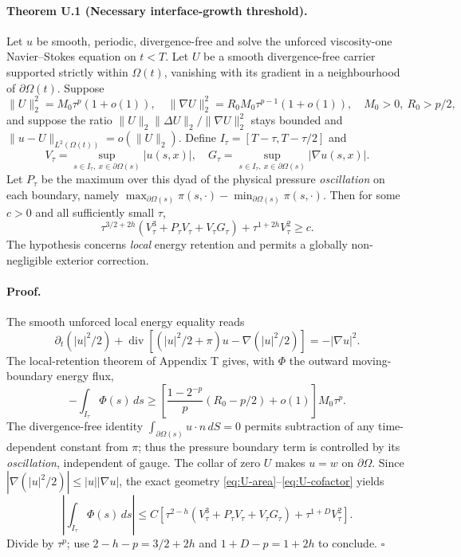 \paragraph{Theorem U.1 (Necessary interface-growth threshold).}
Let $u$ be smooth, periodic, divergence-free and solve the unforced viscosity-one Navier--Stokes equation on $t<T$. Let $U$ be a smooth divergence-free carrier supported strictly within $\Omega(t)$, vanishing with its gradient in a neighbourhood of $\partial\Omega(t)$. Suppose
\[
 \|U\|_2^2=M_0\tau^p(1+o(1)),\quad
 \|\nabla U\|_2^2=R_0M_0\tau^{p-1}(1+o(1)),
 \quad M_0>0,\ R_0>p/2,
\]
and suppose the ratio $\|U\|_2\|\Delta U\|_2/\|\nabla U\|_2^2$ stays bounded and $\|u-U\|_{L^2(\Omega(t))}=o(\|U\|_2)$. Define $I_\tau=[T-\tau,T-\tau/2]$ and
\[
 V_\tau=\sup_{s\in I_\tau,\ x\in\partial\Omega(s)}|u(s,x)|,\quad
 G_\tau=\sup_{s\in I_\tau,\ x\in\partial\Omega(s)}|\nabla u(s,x)|.
\]
Let $P_\tau$ be the maximum over this dyad of the physical pressure \emph{oscillation} on each boundary, namely $\max_{\partial\Omega(s)}\pi(s,\cdot)-\min_{\partial\Omega(s)}\pi(s,\cdot)$. Then for some $c>0$ and all sufficiently small $\tau$,
\begin{equation}\label{eq:U-threshold}
 \boxed{\tau^{3/2+2h}\left(V_\tau^3+P_\tau V_\tau+V_\tau G_\tau\right)
 +\tau^{1+2h}V_\tau^2\ge c.}
\end{equation}
The hypothesis concerns \emph{local} energy retention and permits a globally non-negligible exterior correction.

\paragraph{Proof.}
The smooth unforced local energy equality reads
\[
 \partial_t(|u|^2/2)+\operatorname{div}[ (|u|^2/2+\pi)u-\nabla(|u|^2/2)]
 =-|\nabla u|^2.
\]
The local-retention theorem of Appendix T gives, with $\Phi$ the outward moving-boundary energy flux,
\[
 -\int_{I_\tau}\Phi(s)\,ds\ge
 \left[\frac{1-2^{-p}}{p}(R_0-p/2)+o(1)\right]M_0\tau^p.
\]
The divergence-free identity $\int_{\partial\Omega(s)}u\cdot n\,dS=0$ permits subtraction of any time-dependent constant from $\pi$; thus the pressure boundary term is controlled by its \emph{oscillation}, independent of gauge. The collar of zero $U$ makes $u=w$ on $\partial\Omega$. Since $|\nabla(|u|^2/2)|\le |u||\nabla u|$, the exact geometry \eqref{eq:U-area}--\eqref{eq:U-cofactor} yields
\[
 \left|\int_{I_\tau}\Phi(s)\,ds\right|\le
 C\left[\tau^{2-h}(V_\tau^3+P_\tau V_\tau+V_\tau G_\tau)+\tau^{1+D}V_\tau^2\right].
\]
Divide by $\tau^p$; use $2-h-p=3/2+2h$ and $1+D-p=1+2h$ to conclude. \hfill$\square$

